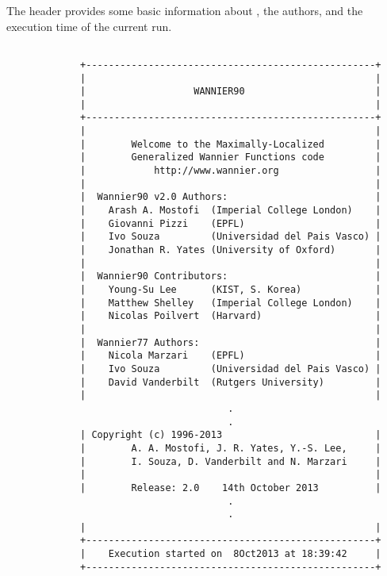 The header provides some basic information about \wannier, the
authors, and the execution time of the current run.

\begin{verbatim}

             +---------------------------------------------------+
             |                                                   |
             |                   WANNIER90                       |
             |                                                   |
             +---------------------------------------------------+
             |                                                   |
             |        Welcome to the Maximally-Localized         |
             |        Generalized Wannier Functions code         |
             |            http://www.wannier.org                 |
             |                                                   |
             |  Wannier90 v2.0 Authors:                          |
             |    Arash A. Mostofi  (Imperial College London)    |
             |    Giovanni Pizzi    (EPFL)                       |
             |    Ivo Souza         (Universidad del Pais Vasco) |
             |    Jonathan R. Yates (University of Oxford)       |
             |                                                   |
             |  Wannier90 Contributors:                          |
             |    Young-Su Lee      (KIST, S. Korea)             |
             |    Matthew Shelley   (Imperial College London)    |
             |    Nicolas Poilvert  (Harvard)                    |
             |                                                   |
             |  Wannier77 Authors:                               |
             |    Nicola Marzari    (EPFL)                       |
             |    Ivo Souza         (Universidad del Pais Vasco) |
             |    David Vanderbilt  (Rutgers University)         |
             |                                                   |
                                       .
                                       .
             | Copyright (c) 1996-2013                           |
             |        A. A. Mostofi, J. R. Yates, Y.-S. Lee,     |
             |        I. Souza, D. Vanderbilt and N. Marzari     |
             |                                                   |
             |        Release: 2.0    14th October 2013          |
                                       .
                                       .
             |                                                   |
             +---------------------------------------------------+
             |    Execution started on  8Oct2013 at 18:39:42     |
             +---------------------------------------------------+

\end{verbatim}


